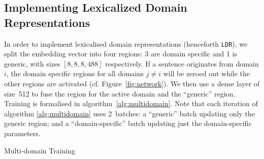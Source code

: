 \subsection{Implementing Lexicalized Domain Representations}

In order to implement lexicalised domain representations (henceforth \texttt{LDR}), we split the embedding vector into four regions: 
3 are domain specific and 1 is generic, with sizes $[8,8,8,488]$ respectively. %
If a sentence originates from domain $i$, the domain specific regions for all domains $j \neq i$ will be zeroed out while the other regions are activated (cf. Figure~\ref{fig:network}). 
We then use a dense layer of size~512 to fuse the region for the active domain and the ``generic'' region. Training is formalised in algorithm~\ref{alg:multidomain}.
%
Note that each iteration of algorithm \ref{alg:multidomain} uses 2~batches: a ``generic'' batch updating only the generic region; and a ``domain-specific'' batch updating just the domain-specific parameters. 

\begin{algorithm}[h]
\caption{Multi-domain Training}
\label{alg:multidomain}
\begin{algorithmic}[1]
\REPEAT 
{}
\end{algorithmic}
\end{algorithm}


